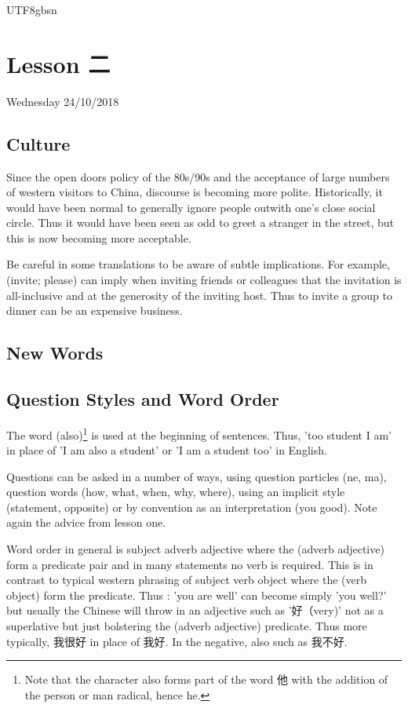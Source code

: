 \documentclass{article}
\newcommand{\myfont}{gbsn} %
\begin{document}
 
\begin{CJK}{UTF8}{\myfont} 
\section{Lesson 二}

Wednesday 24/10/2018

\subsection{Culture}

Since the open doors policy of the 80s/90s and the acceptance of large numbers of western visitors to China, discourse is becoming more polite.  Historically, it would have been normal to generally ignore people outwith one's close social circle.  Thus it would have been seen as odd to greet a stranger in the street, but this is now becoming more acceptable.

Be careful in some translations to be aware of subtle implications.   For example,  (invite; please) can imply when inviting friends or colleagues that the invitation is all-inclusive and at the generosity of the inviting host.   Thus to invite a group to dinner can be an expensive business.

\subsection{New Words}


\subsection{Question Styles and Word Order}

The word  (also)\footnote{Note that the character  also forms part of the word 他 with the addition of the person or man radical, hence he.} is used at the beginning of sentences.   Thus, 'too student I am' in place of 'I am also a student' or 'I am a student too' in English.

Questions can be asked in a number of ways, using question particles (ne, ma), question words (how, what, when, why, where), using an implicit style (statement, opposite) or by convention as an interpretation (you good).  Note again the advice from lesson one.

Word order in general is subject adverb adjective where the (adverb adjective) form a predicate pair and in many statements no verb is required.  This is in contrast to typical western phrasing of subject verb object where the (verb object) form the predicate.   Thus : 'you are well' can become simply 'you well?' but usually the Chinese will throw in an adjective such as '好（very)' not as a superlative but just bolstering the (adverb adjective) predicate.  Thus more typically, 我很好 in place of 我好.  In the negative, also such as 我不好.


\end{CJK}
\end{document}
